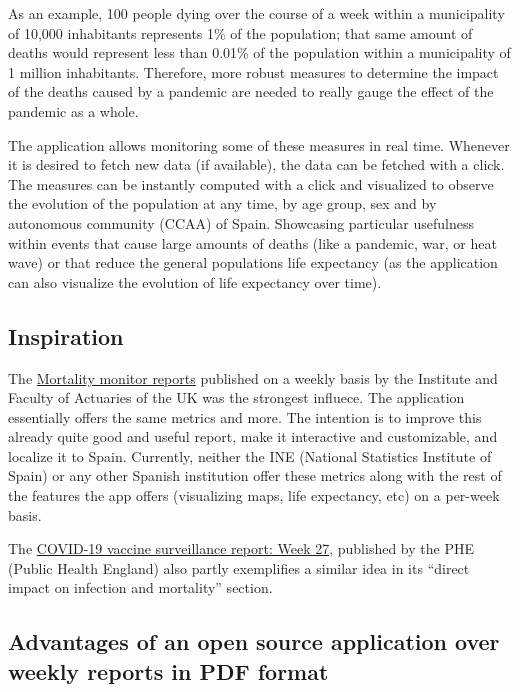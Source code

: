 \documentclass[
  a4paper]{article}
\begin{document}
As an example, 100 people dying over the course of a week within a
municipality of 10,000 inhabitants represents 1\% of the population;
that same amount of deaths would represent less than 0.01\% of the
population within a municipality of 1 million inhabitants. Therefore,
more robust measures to determine the impact of the deaths caused by a
pandemic are needed to really gauge the effect of the pandemic as a
whole.

The application allows monitoring some of these measures in real time.
Whenever it is desired to fetch new data (if available), the data can be
fetched with a click. The measures can be instantly computed with a
click and visualized to observe the evolution of the population at any
time, by age group, sex and by autonomous community (CCAA) of Spain.
Showcasing particular usefulness within events that cause large amounts
of deaths (like a pandemic, war, or heat wave) or that reduce the
general populations life expectancy (as the application can also
visualize the evolution of life expectancy over time).

\hypertarget{inspiration}{%
\subsection{Inspiration}\label{inspiration}}

The
\href{https://www.actuaries.org.uk/learn-and-develop/continuous-mortality-investigation/other-cmi-outputs/mortality-monitor}{Mortality
monitor reports} published on a weekly basis by the Institute and
Faculty of Actuaries of the UK was the strongest influece. The
application essentially offers the same metrics and more. The intention
is to improve this already quite good and useful report, make it
interactive and customizable, and localize it to Spain. Currently,
neither the INE (National Statistics Institute of Spain) or any other
Spanish institution offer these metrics along with the rest of the
features the app offers (visualizing maps, life expectancy, etc) on a
per-week basis.

The
\href{https://assets.publishing.service.gov.uk/government/uploads/system/uploads/attachment_data/file/1000512/Vaccine_surveillance_report_-_week_27.pdf}{COVID-19
vaccine surveillance report: Week 27}, published by the PHE (Public
Health England) also partly exemplifies a similar idea in its ``direct
impact on infection and mortality'' section.

\hypertarget{advantages-of-an-open-source-application-over-weekly-reports-in-pdf-format}{%
\subsection{Advantages of an open source application over weekly reports
in PDF
format}\label{advantages-of-an-open-source-application-over-weekly-reports-in-pdf-format}}
\end{document}
